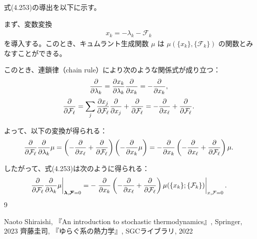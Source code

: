 \documentclass[a4paper,11pt]{jsarticle}
\numberwithin{equation}{section}
\begin{document}
式(4.253)の導出を以下に示す。

まず、変数変換
\begin{align}
x_k = -\lambda_k - \mathcal{F}_k
\end{align}
を導入する。このとき、キュムラント生成関数 $\mu$ は $\mu(\{x_k\}, \{\mathcal{F}_k\})$ の関数とみなすことができる。

このとき、連鎖律（chain rule）により次のような関係式が成り立つ：
\begin{align}
\pdv{}{\lambda_k} = \pdv{x_k}{\lambda_k} \pdv{}{x_k} = -\pdv{}{x_k},
\end{align}
\begin{align}
\pdv{}{\mathcal{F}_\ell} = \sum_j \pdv{x_j}{\mathcal{F}_\ell} \pdv{}{x_j} + \pdv{}{\mathcal{F}_\ell}
= -\pdv{}{x_\ell} + \pdv{}{\mathcal{F}_\ell}.
\end{align}

よって、以下の変換が得られる：
\begin{align}
\pdv{}{\mathcal{F}_\ell} \pdv{}{\lambda_k} \mu
= \left( -\pdv{}{x_\ell} + \pdv{}{\mathcal{F}_\ell} \right) \left( -\pdv{}{x_k} \mu \right)
= -\pdv{}{x_k} \left( -\pdv{}{x_\ell} + \pdv{}{\mathcal{F}_\ell} \right) \mu.
\end{align}

したがって、式(4.253)は次のように得られる：
\begin{align}
\left. \pdv{}{\mathcal{F}_\ell} \pdv{}{\lambda_k} \mu \right|_{\bm{\lambda}, \bm{\mathcal{F}} = 0}
= -\left. \pdv{}{x_k} \left( -\pdv{}{x_\ell} + \pdv{}{\mathcal{F}_\ell} \right) \mu(\{x_k\}; \{\mathcal{F}_k\}) \right|_{x, \mathcal{F} = 0}.
\end{align}9

\begin{thebibliography}{99}
     Naoto Shiraishi, 『An introduction to stochastic thermodynamics』, Springer, 2023
     齊藤圭司, 『ゆらぐ系の熱力学』, SGCライブラリ, 2022
  \end{thebibliography}
  
\end{document}
